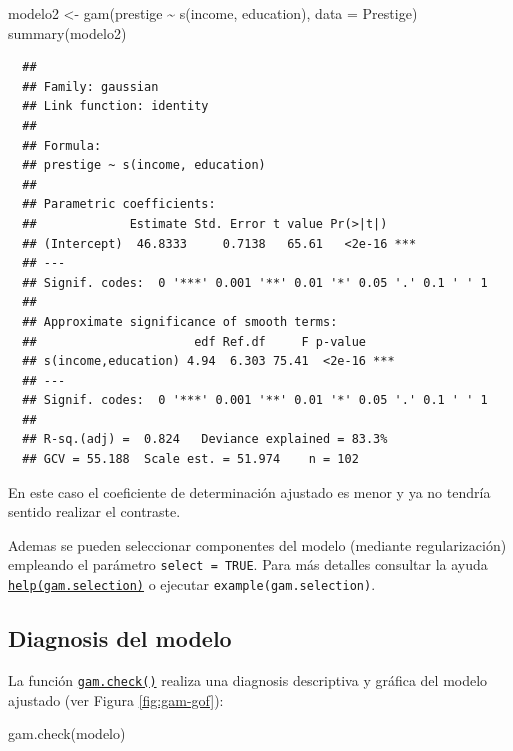 \documentclass[
]{book}
\newenvironment{Shaded}{\begin{snugshade}}{\end{snugshade}}
\newcommand{\AttributeTok}[1]{\textcolor[rgb]{0.77,0.63,0.00}{#1}}
\newcommand{\FunctionTok}[1]{\textcolor[rgb]{0.00,0.00,0.00}{#1}}
\newcommand{\NormalTok}[1]{#1}
\newcommand{\OtherTok}[1]{\textcolor[rgb]{0.56,0.35,0.01}{#1}}
\newcommand{\SpecialCharTok}[1]{\textcolor[rgb]{0.00,0.00,0.00}{#1}}
\theoremstyle{break}
\theoremstyle{nonumberplain}
\begin{document}
\begin{Shaded}
\begin{Highlighting}[]
\NormalTok{modelo2 }\OtherTok{\textless{}{-}} \FunctionTok{gam}\NormalTok{(prestige }\SpecialCharTok{\textasciitilde{}} \FunctionTok{s}\NormalTok{(income, education), }\AttributeTok{data =}\NormalTok{ Prestige)}
\FunctionTok{summary}\NormalTok{(modelo2)}
\end{Highlighting}
\end{Shaded}

\begin{verbatim}
  ## 
  ## Family: gaussian 
  ## Link function: identity 
  ## 
  ## Formula:
  ## prestige ~ s(income, education)
  ## 
  ## Parametric coefficients:
  ##             Estimate Std. Error t value Pr(>|t|)    
  ## (Intercept)  46.8333     0.7138   65.61   <2e-16 ***
  ## ---
  ## Signif. codes:  0 '***' 0.001 '**' 0.01 '*' 0.05 '.' 0.1 ' ' 1
  ## 
  ## Approximate significance of smooth terms:
  ##                      edf Ref.df     F p-value    
  ## s(income,education) 4.94  6.303 75.41  <2e-16 ***
  ## ---
  ## Signif. codes:  0 '***' 0.001 '**' 0.01 '*' 0.05 '.' 0.1 ' ' 1
  ## 
  ## R-sq.(adj) =  0.824   Deviance explained = 83.3%
  ## GCV = 55.188  Scale est. = 51.974    n = 102
\end{verbatim}

En este caso el coeficiente de determinación ajustado es menor y ya no tendría sentido realizar el contraste.

Ademas se pueden seleccionar componentes del modelo (mediante regularización) empleando el parámetro \texttt{select\ =\ TRUE}.
Para más detalles consultar la ayuda \href{https://rdrr.io/pkg/mgcv/man/gam.selection.html}{\texttt{help(gam.selection)}} o ejecutar \texttt{example(gam.selection)}.

\hypertarget{mgcv-diagnosis}{%
\subsection{Diagnosis del modelo}\label{mgcv-diagnosis}}

La función \href{https://rdrr.io/pkg/mgcv/man/gam.check.html}{\texttt{gam.check()}} realiza una diagnosis descriptiva y gráfica del modelo ajustado (ver Figura \ref{fig:gam-gof}):



\begin{Shaded}
\begin{Highlighting}[]
\FunctionTok{gam.check}\NormalTok{(modelo)}
\end{Highlighting}
\end{Shaded}
\end{document}
